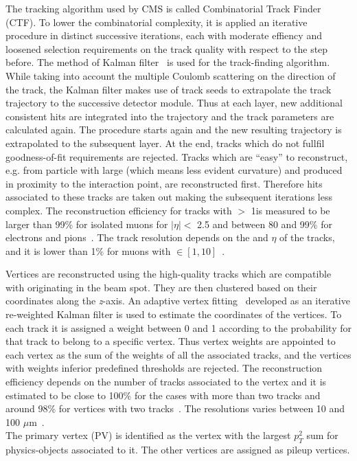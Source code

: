 The tracking algorithm used by CMS is called Combinatorial Track Finder (CTF).
To lower the combinatorial complexity, it is applied an iterative
procedure in distinct successive iterations, each with moderate
effiency and loosened selection requirements on the track quality with
respect to the step before. The method of Kalman
filter~\cite{BILLOIR1990219} is used for the track-finding
algorithm. While taking into account the multiple Coulomb scattering on the
direction of the track, the Kalman filter makes use of track seeds to extrapolate the track
trajectory to the successive detector module. Thus at each layer, new
additional consistent hits
are integrated into the trajectory and the track parameters are
calculated again. The procedure starts again and the new resulting
trajectory is extrapolated to the subsequent layer. At the end, tracks
which do not fullfil goodness-of-fit requirements are rejected. Tracks
which are ``easy'' to reconstruct, e.g. from particle with large \pt
(which means less evident curvature) and produced in proximity to the
interaction point, are reconstructed first. Therefore hits associated
to these tracks are taken out making the subsequent iterations less
complex. The reconstruction efficiency for tracks with \pt $>$ 1\GeV  is measured to be larger
than 99\% for isolated muons for $|\eta| < $ 2.5 and between 80 and
99\% for electrons and pions~\cite{CMS:particleflow}. The track \pt
resolution depends on the \pt and $\eta$ of the tracks, and it is
lower than 1\% for muons with \pt $\in [1,10]$\GeV~\cite{CMS:particleflow}.

Vertices are reconstructed using the high-quality tracks which are
compatible with originating in the beam spot. They are then clustered
based on their coordinates along the \emph{z}-axis. An adaptive vertex
fitting~\cite{Waltenberger_2007} developed as an iterative re-weighted Kalman filter
is used to estimate the coordinates of the vertices. To each track it is assigned a
weight between 0 and 1 according to the probability for that track to
belong to a specific vertex. Thus vertex weights are appointed to each
vertex as the sum of the weights of all the
associated tracks, and the vertices with weights inferior predefined
thresholds are rejected. The reconstruction efficiency depends on the
number of tracks associated to the vertex and it is estimated to
be close to 100\% for the cases with more than two tracks and around
98\% for vertices with two tracks~\cite{CMS:particleflow}. The
resolutions varies between 10 and 100 $\mu$m~\cite{CMS:particleflow}.\\
The primary vertex (PV) is identified as the vertex with the largest $p^2_T$ sum for
physics-objects associated to it. The other vertices are assigned as pileup
vertices.


